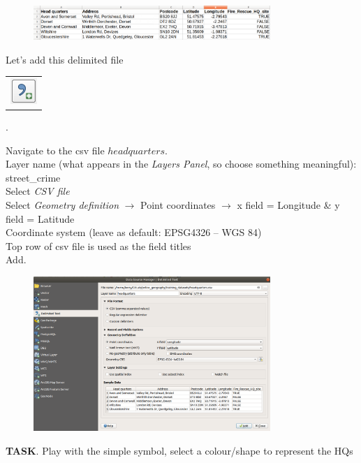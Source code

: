 \begin{figure}[!h]
	\centering
	\includegraphics[width=0.8\textwidth]{images/headquarters_csv.png}
	\caption{}
	\label{ft_fig_firstfig3}
\end{figure}


Let's add this delimited file 
\begin{tabular}{@{}c@{}}\includegraphics[width=4ex]{images/add_delimited_text_layer_icon.png}\end{tabular}
.  

Navigate to the csv file  $headquarters$.\\
Layer name (what appears in the \textit{Layers Panel}, so choose something meaningful): street\_crime\\
Select \textit{CSV file}\\
Select \textit{Geometry definition} $\rightarrow$ Point coordinates $\rightarrow$  
x field = Longitude \& y field = Latitude\\
Coordinate system (leave as default: EPSG4326 – WGS 84)\\
Top row of csv file is used as the field titles\\
Add.\\

\begin{figure}[!h]
	\centering
	\includegraphics[width=0.8\textwidth]{images/data_source_manager_add_delimited_text.png}
	\caption{}
	\label{ft_fig_firstfig3}
\end{figure}


\textbf{TASK}. Play with the simple symbol, select a colour/shape to represent the HQs

